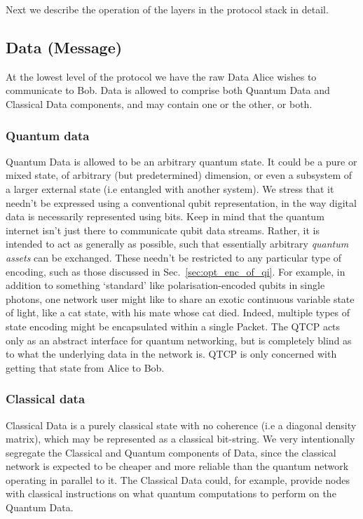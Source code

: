 \documentclass[aps,rmp,twocolumn,amsmath,amssymb,nofootinbib,superscriptaddress,longbibliography,floatfix]{revtex4-1}
\begin{document}
Next we describe the operation of the layers in the protocol stack in detail.

%
%

\subsection{Data (Message)}

At the lowest level of the protocol we have the raw {\sc Data} Alice wishes to communicate to Bob. {\sc Data} is allowed to comprise both {\sc Quantum Data} and {\sc Classical Data} components, and may contain one or the other, or both.

%
%

\subsubsection{Quantum data}

{\sc Quantum Data} is allowed to be an arbitrary quantum state. It could be a pure or mixed state, of arbitrary (but predetermined) dimension, or even a subsystem of a larger external state (i.e entangled with another system). We stress that it needn't be expressed using a conventional qubit representation, in the way digital data is necessarily represented using bits. Keep in mind that the quantum internet isn't just there to communicate qubit data streams. Rather, it is intended to act as generally as possible, such that essentially arbitrary \emph{quantum assets} can be exchanged. These needn't be restricted to any particular type of encoding, such as those discussed in Sec.~\ref{sec:opt_enc_of_qi}. For example, in addition to something `standard' like polarisation-encoded qubits in single photons, one network user might like to share an exotic continuous variable state of light, like a cat state, with his mate whose cat died. Indeed, multiple types of state encoding might be encapsulated within a single {\sc Packet}. The QTCP acts only as an abstract interface for quantum networking, but is completely blind as to what the underlying data in the network is. QTCP is only concerned with getting that state from Alice to Bob.

%
%

\subsubsection{Classical data}

{\sc Classical Data} is a purely classical state with no coherence (i.e a diagonal density matrix), which may be represented as a classical bit-string. We very intentionally segregate the {\sc Classical} and {\sc Quantum} components of {\sc Data}, since the classical network is expected to be cheaper and more reliable than the quantum network operating in parallel to it. The {\sc Classical Data} could, for example, provide nodes with classical instructions on what quantum computations to perform on the {\sc Quantum Data}.
\end{document}
